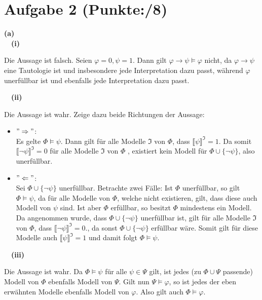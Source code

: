 \documentclass[11pt, a4paper]{article}
\newcommand{\p}{8}
\begin{document}
\section*{Aufgabe 2 (Punkte:\qquad/\p)}
\textbf{(a)}\\
\null\ \ \textbf{(i)}
\begin{adjustwidth}{20pt}{20pt}
Die Aussage ist falsch. Seien $\varphi=0, \psi=1$. Dann gilt $\varphi \rightarrow \psi \models \varphi$ nicht, da $\varphi \rightarrow \psi$ eine Tautologie ist und insbesondere
jede Interpretation dazu passt, während $\varphi$ unerfüllbar ist und ebenfalls jede Interpretation dazu passt.
\end{adjustwidth}
\null\ \ \textbf{(ii)}
\begin{adjustwidth}{20pt}{20pt}
Die Aussage ist wahr. Zeige dazu beide Richtungen der Aussage:
\end{adjustwidth}
\begin{itemize}
\item $"\Rightarrow"$:\\
Es gelte $\Phi \models \psi$. Dann gilt für alle Modelle $\mathfrak{I}$ von $\Phi$, dass $\llbracket \psi\rrbracket^{\mathfrak{I}}=1$. Da somit
$\llbracket \neg\psi\rrbracket^{\mathfrak{I}}=0$ für alle Modelle $\mathfrak{I}$ von $\Phi$ , existiert kein Modell für $\Phi \cup \{ \neg\psi \}$, also unerfüllbar.
\item $"\Leftarrow"$:\\
Sei $\Phi \cup \{ \neg\psi \}$ unerfüllbar. Betrachte zwei Fälle: Ist $\Phi$ unerfüllbar, so gilt $\Phi \models \psi$, da für alle Modelle von $\Phi$, welche nicht existieren, gilt, dass
diese auch Modell von $\psi$ sind. Ist aber $\Phi$ erfüllbar, so besitzt $\Phi$ mindestens ein Modell. Da angenommen wurde, dass $\Phi \cup \{ \neg\psi \}$ unerfüllbar ist, gilt für
alle Modelle $\mathfrak{I}$ von $\Phi$, dass $\llbracket \neg\psi\rrbracket^{\mathfrak{I}}=0$., da sonst $\Phi \cup \{ \neg\psi \}$ erfüllbar wäre. Somit gilt für diese Modelle auch
$\llbracket \psi\rrbracket^{\mathfrak{I}}=1$ und damit folgt $\Phi \models \psi$.
\end{itemize}
\null\ \ \textbf{(iii)}
\begin{adjustwidth}{20pt}{20pt}
Die Aussage ist wahr. Da $\Phi \models \psi$ für alle $\psi \in \Psi$ gilt, ist jedes (zu $\Phi \cup \Psi$ passende) Modell von $\Phi$ ebenfalls Modell von $\Psi$. Gilt nun $\Psi \models \varphi$,
so ist jedes der eben erwähnten Modelle ebenfalls Modell von $\varphi$. Also gilt auch $\Phi \models \varphi$.
\end{adjustwidth}
\end{document}
